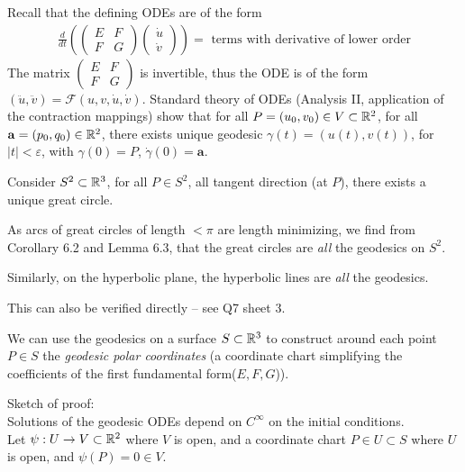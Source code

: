 \documentclass[a4paper]{article}
\begin{document}
Recall that the defining ODEs are of the form
\begin{equation*}
\begin{aligned}
\frac{d}{dt} \left(\left(\begin{matrix}
E & F\\
F & G
\end{matrix}\right)\left(\begin{matrix}
\dot{u}\\
\dot{v}
\end{matrix}\right)\right) = \text{ terms with derivative of lower order}
\end{aligned}
\end{equation*}
The matrix $\left(\begin{matrix}
E & F\\
F & G
\end{matrix}\right)$ is invertible, thus the ODE is of the form $(\ddot{u},\ddot{v}) = \mathcal{F}(u,v,\dot{u},\dot{v})$. Standard theory of ODEs (Analysis II, application of the contraction mappings) show that for all $P=(u_0,v_0) \in V \subset \mathbb{R}^2$, for all $\mathbf{a} = (p_0,q_0) \in \mathbb{R}^2$, there exists unique geodesic $\gamma(t) = (u(t),v(t))$, for $|t|<\varepsilon$, with $\gamma(0) = P$, $\dot{\gamma}(0) = \mathbf{a}$.

\begin{eg}
Consider $S^2 \subset \mathbb{R}^3$, for all $P \in S^2$, all tangent direction (at $P$), there exists a unique great circle.

As arcs of great circles of length $<\pi$ are length minimizing, we find from Corollary 6.2 and Lemma 6.3, that the great circles are \emph{all} the geodesics on $S^2$.

Similarly, on the hyperbolic plane, the hyperbolic lines are \emph{all} the geodesics.

This can also be verified directly -- see Q7 sheet 3.
\end{eg}

We can use the geodesics on a surface $S \subset \mathbb{R}^3$ to construct around each point $P \in S$ the \emph{geodesic polar coordinates} (a coordinate chart simplifying the coefficients of the first fundamental form($E,F,G$)).

Sketch of proof:\\
Solutions of the geodesic ODEs depend on $C^\infty$ on the initial conditions.\\
Let $\psi:U \to V \subset \mathbb{R}^2$ where $V$ is open, and a coordinate chart $P \in U \subset S$ where $U$ is open, and $\psi(P) = 0 \in V$.
\end{document}
